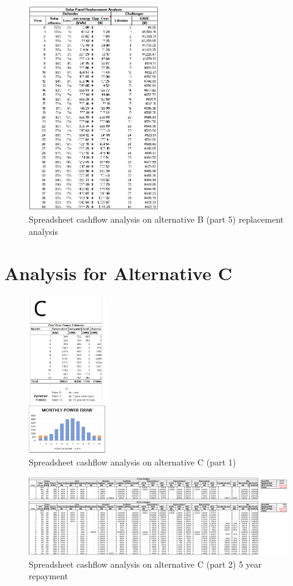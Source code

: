\documentclass[10pt,letterpaper]{article}
\begin{document}
\begin{figure}[H]
	\centering
	\includegraphics[width=0.5\textwidth]{assets/1534570277965}
	\caption{Spreadsheet cashflow analysis on alternative B (part 5) replacement analysis}
\end{figure}

\clearpage
\section{Analysis for Alternative C}\label{appendix:c}
\begin{figure}[H]
	\centering
	\includegraphics[width=0.3\textwidth]{assets/1534570985625}
	\caption{Spreadsheet cashflow analysis on alternative C (part 1)}
\end{figure}

\begin{figure}[H]
	\centering
	\includegraphics[width=1.0\textwidth]{assets/1534570889581}
	\caption{Spreadsheet cashflow analysis on alternative C (part 2) 5 year repayment}
\end{figure}
\end{document}

